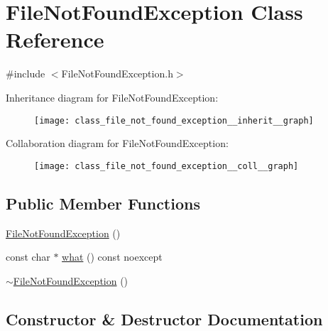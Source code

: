 \hypertarget{class_file_not_found_exception}{}\section{File\+Not\+Found\+Exception Class Reference}
\label{class_file_not_found_exception}


{\ttfamily \#include $<$File\+Not\+Found\+Exception.\+h$>$}



Inheritance diagram for File\+Not\+Found\+Exception\+:
\nopagebreak
\begin{figure}[H]
\begin{center}
\leavevmode
\texttt{[image: class\_file\_not\_found\_exception\_\_inherit\_\_graph]}
\end{center}
\end{figure}


Collaboration diagram for File\+Not\+Found\+Exception\+:
\nopagebreak
\begin{figure}[H]
\begin{center}
\leavevmode
\texttt{[image: class\_file\_not\_found\_exception\_\_coll\_\_graph]}
\end{center}
\end{figure}
\subsection*{Public Member Functions}
\begin{DoxyCompactItemize}
\item 
\mbox{\hyperlink{class_file_not_found_exception_ade06f0cd48d712b2377a37cd8aff9cc0}{File\+Not\+Found\+Exception}} ()
\item 
const char $\ast$ \mbox{\hyperlink{class_file_not_found_exception_a9da271db183239e7a1ff7fe182502b80}{what}} () const noexcept
\item 
\mbox{\hyperlink{class_file_not_found_exception_abd5d5c0ea4ac795741b20b0e4a9fb1ff}{$\sim$\+File\+Not\+Found\+Exception}} ()
\end{DoxyCompactItemize}


\subsection{Constructor \& Destructor Documentation}
\mbox{\label{class_file_not_found_exception_ade06f0cd48d712b2377a37cd8aff9cc0}} 

